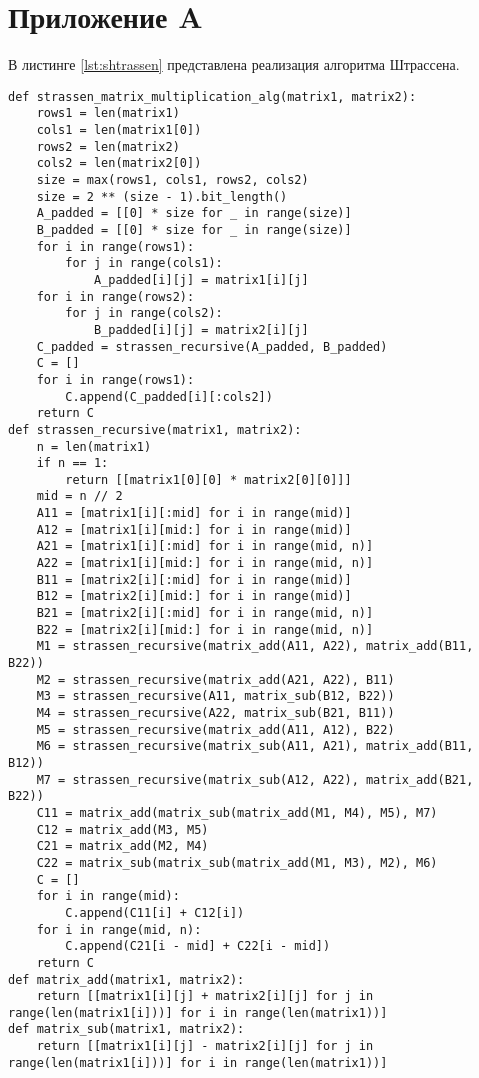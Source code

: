 \section*{Приложение A}
В листинге \ref{lst:shtrassen} представлена реализация алгоритма Штрассена.
\begin{center}
	\captionsetup{justification=raggedright,singlelinecheck=off}
	\begin{lstlisting}[label=lst:shtrassen,caption=Алгоритм Штрассена]
def strassen_matrix_multiplication_alg(matrix1, matrix2):
	rows1 = len(matrix1)
	cols1 = len(matrix1[0])
	rows2 = len(matrix2)
	cols2 = len(matrix2[0])
	size = max(rows1, cols1, rows2, cols2)
	size = 2 ** (size - 1).bit_length()
	A_padded = [[0] * size for _ in range(size)]
	B_padded = [[0] * size for _ in range(size)]
	for i in range(rows1):
		for j in range(cols1):
			A_padded[i][j] = matrix1[i][j]
	for i in range(rows2):
		for j in range(cols2):
			B_padded[i][j] = matrix2[i][j]
	C_padded = strassen_recursive(A_padded, B_padded)
	C = []
	for i in range(rows1):
		C.append(C_padded[i][:cols2])
	return C
def strassen_recursive(matrix1, matrix2):
	n = len(matrix1)
	if n == 1:
		return [[matrix1[0][0] * matrix2[0][0]]]
	mid = n // 2
	A11 = [matrix1[i][:mid] for i in range(mid)]
	A12 = [matrix1[i][mid:] for i in range(mid)]
	A21 = [matrix1[i][:mid] for i in range(mid, n)]
	A22 = [matrix1[i][mid:] for i in range(mid, n)]
	B11 = [matrix2[i][:mid] for i in range(mid)]
	B12 = [matrix2[i][mid:] for i in range(mid)]
	B21 = [matrix2[i][:mid] for i in range(mid, n)]
	B22 = [matrix2[i][mid:] for i in range(mid, n)]
	M1 = strassen_recursive(matrix_add(A11, A22), matrix_add(B11, B22))
	M2 = strassen_recursive(matrix_add(A21, A22), B11)
	M3 = strassen_recursive(A11, matrix_sub(B12, B22))
	M4 = strassen_recursive(A22, matrix_sub(B21, B11))
	M5 = strassen_recursive(matrix_add(A11, A12), B22)
	M6 = strassen_recursive(matrix_sub(A11, A21), matrix_add(B11, B12))
	M7 = strassen_recursive(matrix_sub(A12, A22), matrix_add(B21, B22))
	C11 = matrix_add(matrix_sub(matrix_add(M1, M4), M5), M7)
	C12 = matrix_add(M3, M5)
	C21 = matrix_add(M2, M4)
	C22 = matrix_sub(matrix_sub(matrix_add(M1, M3), M2), M6)
	C = []
	for i in range(mid):
		C.append(C11[i] + C12[i])
	for i in range(mid, n):
		C.append(C21[i - mid] + C22[i - mid])
	return C
def matrix_add(matrix1, matrix2):
	return [[matrix1[i][j] + matrix2[i][j] for j in range(len(matrix1[i]))] for i in range(len(matrix1))]
def matrix_sub(matrix1, matrix2):
	return [[matrix1[i][j] - matrix2[i][j] for j in range(len(matrix1[i]))] for i in range(len(matrix1))]
	\end{lstlisting}
\end{center}
